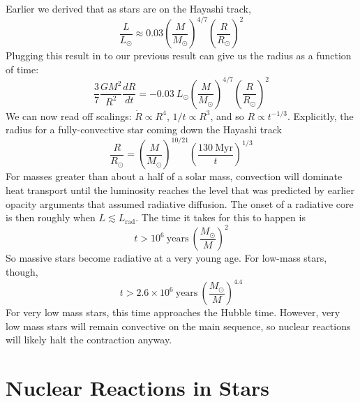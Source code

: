 \documentclass[10pt]{article}
\numberwithin{equation}{section}
\begin{document}
  Earlier we derived that as stars are on the Hayashi track,
  \begin{equation}
    \label{eq:88}
    \frac{L}{L_\odot}\approx 0.03\left(\frac{M}{M_\odot}\right)^{4/7}\left
(\frac{R}{R_\odot}\right)^2
  \end{equation}
  Plugging this result in to our previous result can give us the
  radius as a function of time:
  \begin{equation}
    \label{eq:89}
    \frac{3}{7}\frac{GM^2}{R^2}\frac{dR}{dt}=-0.03\ L_\odot\left(\frac{M}
{M_\odot}\right)^{4/7}\left(\frac{R}{R_\odot}\right)^2
  \end{equation}
  We can now read off scalings: $\dot{R}\propto R^4$, $1/t\propto
  R^3$, and so $R\propto t^{-1/3}$. Explicitly, the radius for a
  fully-convective star coming down the Hayashi track
  \begin{equation}
    \label{eq:90}
    \frac{R}{R_\odot}=\left(\frac{M}{M_\odot}\right)^{10/21}\left(\frac
{130\ \mathrm{Myr}}{t}\right)^{1/3}
  \end{equation}
  For masses greater than about a half of a solar mass, convection
  will dominate heat transport until the luminosity reaches the level
  that was predicted by earlier opacity arguments that assumed
  radiative diffusion. The onset of a radiative core is then roughly
  when $L\lesssim L_{\mathrm{rad}}$. The time it takes for this to
  happen is
  \begin{equation}
    \label{eq:91}
    t>10^6\ \mathrm{years}\ \left(\frac{M_\odot}{M}\right)^2
  \end{equation}
  So massive stars become radiative at a very young age. For low-mass
  stars, though,
  \begin{equation}
    \label{eq:92}
    t>2.6\times 10^6\ \mathrm{years}\ \left(\frac{M_\odot}{M}\right)^{4.4}
  \end{equation}
  For very low mass stars, this time approaches the Hubble
  time. However, very low mass stars will remain convective on the
  main sequence, so nuclear reactions will likely halt the contraction
  anyway.

  \section{Nuclear Reactions in Stars}
  \label{sec:nucl-react-stars}
\end{document}

